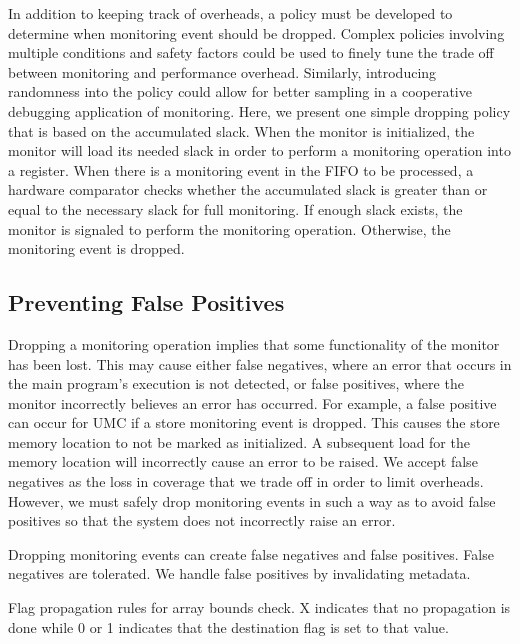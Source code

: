 In addition to keeping track of overheads, a policy must be developed to
determine when monitoring event should be dropped. Complex policies involving
multiple conditions and safety factors could be used to finely tune
the trade off between monitoring and performance overhead. Similarly, introducing
randomness into the policy could allow for better sampling in a cooperative
debugging application of monitoring. Here, we present one simple
dropping policy that is based on the accumulated slack.
When the monitor is initialized, the monitor will load
its needed slack in order to perform a monitoring operation into a register. When
there is a monitoring event in the FIFO to be processed, a hardware comparator
checks whether the accumulated slack is greater than or equal to the necessary
slack for full monitoring. If enough slack exists, the monitor is signaled to
perform the monitoring operation. Otherwise, the monitoring event is dropped.

\subsection{Preventing False Positives}
\label{sec:drop.false_positives}

Dropping a monitoring operation implies that some functionality of the monitor
has been lost. This may cause either false negatives, where an error that
occurs in the main program's execution is not detected, or false positives,
where the monitor incorrectly believes an error has occurred. For example, a
false positive can occur for UMC if a store monitoring event is dropped. This
causes the store memory location to not be marked as initialized. A subsequent
load for the memory location will incorrectly cause an error to be raised.  We
accept false negatives as the loss in coverage that we trade off in order to
limit overheads.  However, we must safely drop monitoring events in such a way
as to avoid false positives so that the system does not incorrectly raise an
error.

Dropping monitoring events can create false negatives and false positives.
False negatives are tolerated. We handle false positives by invalidating
metadata.

\begin{table}[tb]
  \begin{center}
    \begin{small}
    
    \end{small}
    \caption{Flag propagation rules for array bounds check. X indicates that no
    propagation is done while 0 or 1 indicates that the destination flag is set
    to that value.}
    \label{tab:drop.propagation_rules}
    \vspace{-0.2in}
  \end{center}
\end{table}

